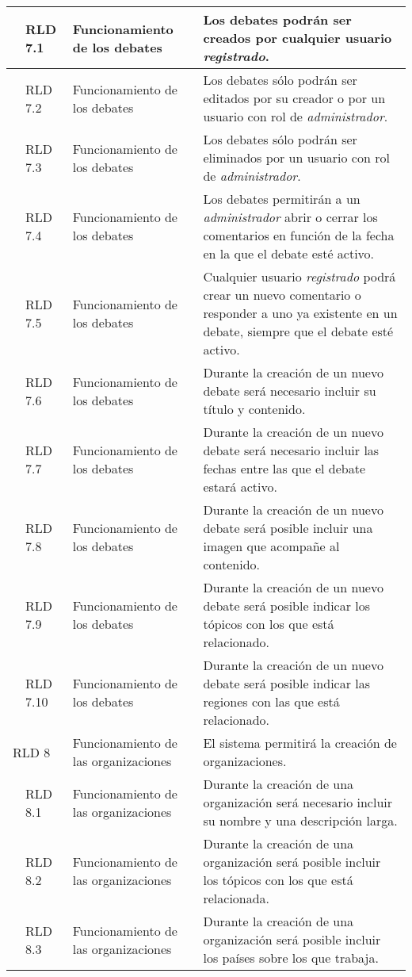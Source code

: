 \begin{longtable}[c]{|p{1mm}|p{14mm}|p{30mm}|p{90mm}|}
\hline
& RLD 7.1 & Funcionamiento de los debates & Los debates podrán ser creados por cualquier usuario \textit{registrado}. \\
\hline
& RLD 7.2 & Funcionamiento de los debates & Los debates sólo podrán ser editados por su creador o por un usuario con rol de \textit{administrador}. \\
\hline
& RLD 7.3 & Funcionamiento de los debates & Los debates sólo podrán ser eliminados por un usuario con rol de \textit{administrador}. \\
\hline
& RLD 7.4 & Funcionamiento de los debates & Los debates permitirán a un \textit{administrador} abrir o cerrar los comentarios en función de la fecha en la que el debate esté activo. \\
\hline
& RLD 7.5 & Funcionamiento de los debates & Cualquier usuario \textit{registrado} podrá crear un nuevo comentario o responder a uno ya existente en un debate, siempre que el debate esté activo. \\
\hline
& RLD 7.6 & Funcionamiento de los debates & Durante la creación de un nuevo debate será necesario incluir su título y contenido. \\
\hline
& RLD 7.7 & Funcionamiento de los debates & Durante la creación de un nuevo debate será necesario incluir las fechas entre las que el debate estará activo. \\
\hline
& RLD 7.8 & Funcionamiento de los debates & Durante la creación de un nuevo debate será posible incluir una imagen que acompañe al contenido. \\
\hline
& RLD 7.9 & Funcionamiento de los debates & Durante la creación de un nuevo debate será posible indicar los tópicos con los que está relacionado. \\
\hline
& RLD 7.10 & Funcionamiento de los debates & Durante la creación de un nuevo debate será posible indicar las regiones con las que está relacionado. \\
\hline
\multicolumn{2}{|l|}{RLD 8} & Funcionamiento de las organizaciones & El sistema permitirá la creación de organizaciones. \\
\hline
& RLD 8.1 & Funcionamiento de las organizaciones & Durante la creación de una organización será necesario incluir su nombre y una descripción larga. \\
\hline
& RLD 8.2 & Funcionamiento de las organizaciones & Durante la creación de una organización será posible incluir los tópicos con los que está relacionada. \\
\hline
& RLD 8.3 & Funcionamiento de las organizaciones & Durante la creación de una organización será posible incluir los países sobre los que trabaja. \\

\end{longtable}
